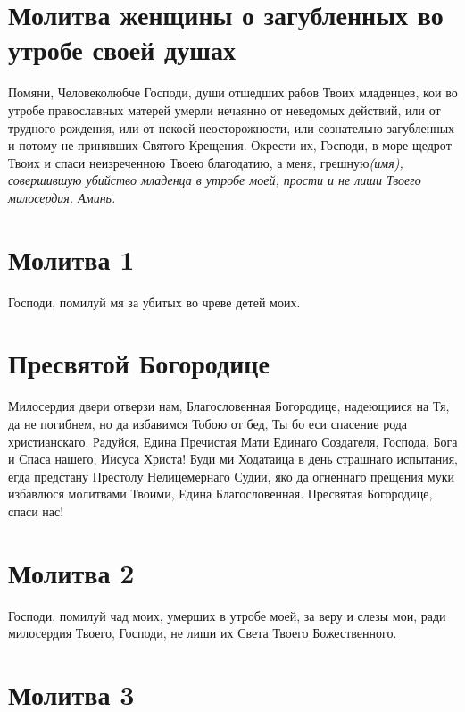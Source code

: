 \section{Молитва женщины о загубленных во утробе своей душах}
 


Помяни, Человеколюбче Господи, души отшедших рабов Твоих младенцев, кои во утробе православных матерей умерли нечаянно от неведомых действий, или от трудного рождения, или от некоей неосторожности, или сознательно загубленных и потому не принявших Святого Крещения. Окрести их, Господи, в море щедрот Твоих и спаси неизреченною Твоею благодатию, а меня, грешную\itshape  (имя\normalfont{}), совершившую убийство младенца в утробе моей, прости и не лиши Твоего милосердия. Аминь.


\section{Молитва 1}
 
Господи, помилуй мя за убитых во чреве детей моих.

\section{Пресвятой Богородице}
 

Милосердия двери отверзи нам, Благословенная Богородице, надеющиися на Тя, да не погибнем, но да избавимся Тобою от бед, Ты бо еси спасение рода христианскаго. Радуйся, Едина Пречистая Мати Единаго Создателя, Господа, Бога и Спаса нашего, Иисуса Христа! Буди ми Ходатаица в день страшнаго испытания, егда предстану Престолу Нелицемернаго Судии, яко да огненнаго прещения муки избавлюся молитвами Твоими, Едина Благословенная. Пресвятая Богородице, спаси нас!


\section{Молитва 2}
 


Господи, помилуй чад моих, умерших в утробе моей, за веру и слезы мои, ради милосердия Твоего, Господи, не лиши их Света Твоего Божественного.

\section{Молитва 3}
 


